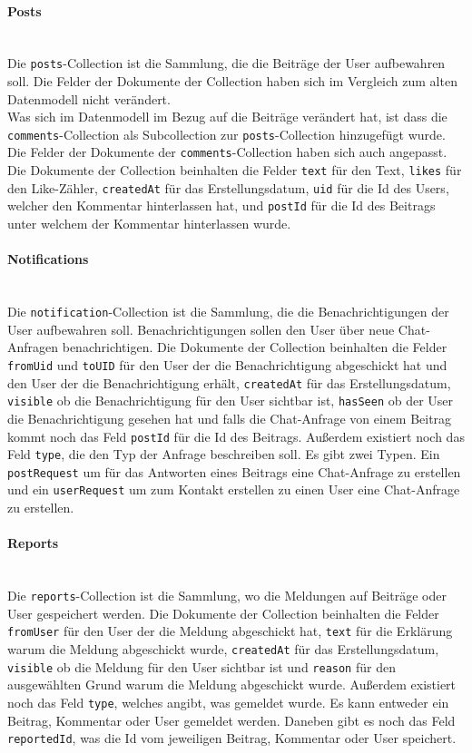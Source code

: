 \paragraph{Posts}\mbox{} \\
Die \texttt{posts}-Collection ist die Sammlung, die die Beiträge der User aufbewahren soll. Die Felder der Dokumente der Collection haben sich im Vergleich zum alten Datenmodell nicht verändert.
\\
Was sich im Datenmodell im Bezug auf die Beiträge verändert hat, ist dass die \texttt{comments}-Collection als Subcollection zur \texttt{posts}-Collection hinzugefügt wurde. Die Felder der Dokumente der \texttt{comments}-Collection haben sich auch angepasst. Die Dokumente der Collection beinhalten die Felder \texttt{text} für den Text, \texttt{likes} für den Like-Zähler, \texttt{createdAt} für das Erstellungsdatum, \texttt{uid} für die Id des Users, welcher den Kommentar hinterlassen hat, und \texttt{postId} für die Id des Beitrags unter welchem der Kommentar hinterlassen wurde.

\paragraph{Notifications}\mbox{} \\
Die \texttt{notification}-Collection ist die Sammlung, die die Benachrichtigungen der User aufbewahren soll. Benachrichtigungen sollen den User über neue Chat-Anfragen benachrichtigen. Die Dokumente der Collection beinhalten die Felder \texttt{fromUid} und \texttt{toUID} für den User der die Benachrichtigung abgeschickt hat und den User der die Benachrichtigung erhält, \texttt{createdAt} für das Erstellungsdatum, \texttt{visible} ob die Benachrichtigung für den User sichtbar ist, \texttt{hasSeen} ob der User die Benachrichtigung gesehen hat und falls die Chat-Anfrage von einem Beitrag kommt noch das Feld \texttt{postId} für die Id des Beitrags. Außerdem existiert noch das Feld \texttt{type}, die den Typ der Anfrage beschreiben soll. Es gibt zwei Typen. Ein \texttt{postRequest} um für das Antworten eines Beitrags eine Chat-Anfrage zu erstellen und ein \texttt{userRequest} um zum Kontakt erstellen zu einen User eine Chat-Anfrage zu erstellen.

\paragraph{Reports}\mbox{} \\
Die \texttt{reports}-Collection ist die Sammlung, wo die Meldungen auf Beiträge oder User gespeichert werden. Die Dokumente der Collection beinhalten die Felder \texttt{fromUser} für den User der die Meldung abgeschickt hat, \texttt{text} für die Erklärung warum die Meldung abgeschickt wurde, \texttt{createdAt} für das Erstellungsdatum, \texttt{visible} ob die Meldung für den User sichtbar ist und \texttt{reason} für den ausgewählten Grund warum die Meldung abgeschickt wurde. Außerdem existiert noch das Feld \texttt{type}, welches angibt, was gemeldet wurde. Es kann entweder ein Beitrag, Kommentar oder User gemeldet werden. Daneben gibt es noch das Feld \texttt{reportedId}, was die Id vom jeweiligen Beitrag, Kommentar oder User speichert.

